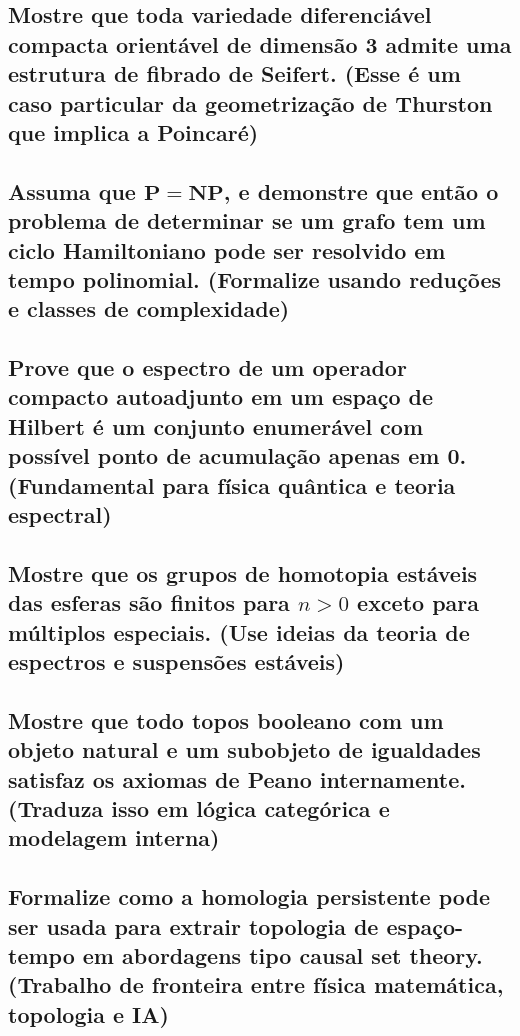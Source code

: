 \documentclass{article}
\begin{document}
\subsection{Mostre que toda variedade diferenciável compacta orientável de dimensão 3 admite uma estrutura de fibrado de Seifert. (Esse é um caso particular da geometrização de Thurston que implica a Poincaré)}

\subsection{Assuma que $\mathbf{P} = \mathbf{NP}$, e demonstre que então o problema de determinar se um grafo tem um ciclo Hamiltoniano pode ser resolvido em tempo polinomial. (Formalize usando reduções e classes de complexidade)}

\subsection{Prove que o espectro de um operador compacto autoadjunto em um espaço de Hilbert é um conjunto enumerável com possível ponto de acumulação apenas em 0. (Fundamental para física quântica e teoria espectral)}

\subsection{Mostre que os grupos de homotopia estáveis das esferas são finitos para $n \gt 0$  exceto para múltiplos especiais. (Use ideias da teoria de espectros e suspensões estáveis)}

\subsection{Mostre que todo topos booleano com um objeto natural e um subobjeto de igualdades satisfaz os axiomas de Peano internamente. (Traduza isso em lógica categórica e modelagem interna)}

\subsection{Formalize como a homologia persistente pode ser usada para extrair topologia de espaço-tempo em abordagens tipo causal set theory. (Trabalho de fronteira entre física matemática, topologia e IA)}
\end{document}
